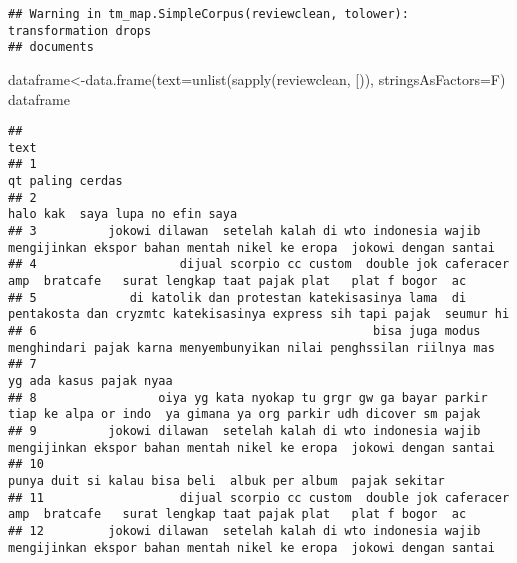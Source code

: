 \documentclass[
]{article}
\newenvironment{Shaded}{\begin{snugshade}}{\end{snugshade}}
\newcommand{\AttributeTok}[1]{\textcolor[rgb]{0.77,0.63,0.00}{#1}}
\newcommand{\FunctionTok}[1]{\textcolor[rgb]{0.00,0.00,0.00}{#1}}
\newcommand{\NormalTok}[1]{#1}
\newcommand{\OtherTok}[1]{\textcolor[rgb]{0.56,0.35,0.01}{#1}}
\newcommand{\StringTok}[1]{\textcolor[rgb]{0.31,0.60,0.02}{#1}}
\begin{document}
\begin{verbatim}
## Warning in tm_map.SimpleCorpus(reviewclean, tolower): transformation drops
## documents
\end{verbatim}

\begin{Shaded}
\begin{Highlighting}[]
\NormalTok{dataframe}\OtherTok{\textless{}{-}}\FunctionTok{data.frame}\NormalTok{(}\AttributeTok{text=}\FunctionTok{unlist}\NormalTok{(}\FunctionTok{sapply}\NormalTok{(reviewclean, }\StringTok{\textasciigrave{}}\AttributeTok{[}\StringTok{\textasciigrave{}}\NormalTok{)), }\AttributeTok{stringsAsFactors=}\NormalTok{F)}
\NormalTok{dataframe}
\end{Highlighting}
\end{Shaded}

\begin{verbatim}
##                                                                                                                                 text
## 1                                                                                                                  qt paling cerdas 
## 2                                                                                                   halo kak  saya lupa no efin saya
## 3          jokowi dilawan  setelah kalah di wto indonesia wajib mengijinkan ekspor bahan mentah nikel ke eropa  jokowi dengan santai
## 4                    dijual scorpio cc custom  double jok caferacer amp  bratcafe   surat lengkap taat pajak plat   plat f bogor  ac
## 5             di katolik dan protestan katekisasinya lama  di pentakosta dan cryzmtc katekisasinya express sih tapi pajak  seumur hi
## 6                                               bisa juga modus menghindari pajak karna menyembunyikan nilai penghssilan riilnya mas
## 7                                                                                                            yg ada kasus pajak nyaa
## 8                 oiya yg kata nyokap tu grgr gw ga bayar parkir tiap ke alpa or indo  ya gimana ya org parkir udh dicover sm pajak 
## 9          jokowi dilawan  setelah kalah di wto indonesia wajib mengijinkan ekspor bahan mentah nikel ke eropa  jokowi dengan santai
## 10                                                                   punya duit si kalau bisa beli  albuk per album  pajak sekitar  
## 11                   dijual scorpio cc custom  double jok caferacer amp  bratcafe   surat lengkap taat pajak plat   plat f bogor  ac
## 12         jokowi dilawan  setelah kalah di wto indonesia wajib mengijinkan ekspor bahan mentah nikel ke eropa  jokowi dengan santai

\end{verbatim}
\end{document}
